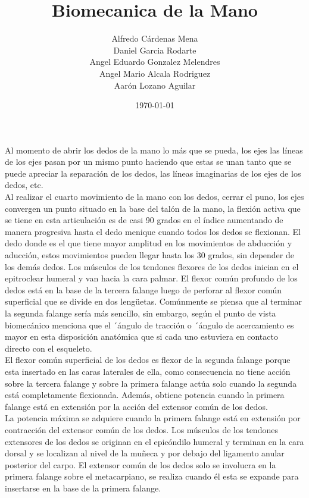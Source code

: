 \documentclass{article}
\author{Alfredo Cárdenas Mena \\
Daniel Garcia Rodarte\\
Angel Eduardo Gonzalez Melendres \\
Angel Mario Alcala Rodriguez \\
Aarón Lozano Aguilar} %
\title{Biomecanica de la Mano} %
\date{\today}
\begin{document}

\maketitle %

\label{Title} %
Al momento de abrir los dedos de la mano lo más que se pueda, los ejes las líneas de los ejes pasan por un mismo punto haciendo que estas se unan tanto que se puede apreciar la separación de los dedos, las líneas imaginarias de los ejes de los dedos, etc.\\
Al realizar el cuarto movimiento de la mano con los dedos, cerrar el puno, los ejes convergen un punto situado en la base del talón de la mano, la flexión activa que se tiene en esta articulación es de casi 90 grados en el índice aumentando de manera progresiva hasta el dedo menique cuando todos los dedos se flexionan.
El dedo donde es el que tiene mayor amplitud en los movimientos de abducción y aducción, estos movimientos pueden llegar hasta los 30 grados, sin depender de los demás dedos.
Los músculos de los tendones flexores de los dedos inician en el epitroclear humeral y van hacia la cara palmar.
El flexor común profundo de los dedos está en la base de la tercera falange luego de perforar al flexor común superficial que se divide en dos lengüetas.
Comúnmente se piensa que al terminar la segunda falange sería más sencillo, sin embargo, según el punto de vista biomecánico menciona que el ´ángulo de tracción o ´ángulo de acercamiento es mayor en esta disposición anatómica que si cada uno estuviera en contacto directo con el esqueleto.\\
El flexor común superficial de los dedos es flexor de la segunda falange porque esta insertado en las caras laterales de ella, como consecuencia no tiene acción sobre la tercera falange y sobre la primera falange actúa solo cuando la segunda está completamente flexionada.
Además, obtiene potencia cuando la primera falange está en extensión por la acción del extensor común de los dedos.\\
La potencia máxima se adquiere cuando la primera falange está en extensión por contracción del extensor común de los dedos.
Los músculos de los tendones extensores de los dedos se originan en el epicóndilo humeral y terminan en la cara dorsal y se localizan al nivel de la muñeca y por debajo del ligamento anular posterior del carpo.
El extensor común de los dedos solo se involucra en la primera falange sobre el metacarpiano, se realiza cuando él esta se expande para insertarse en la base de la primera falange.
\end{document}
